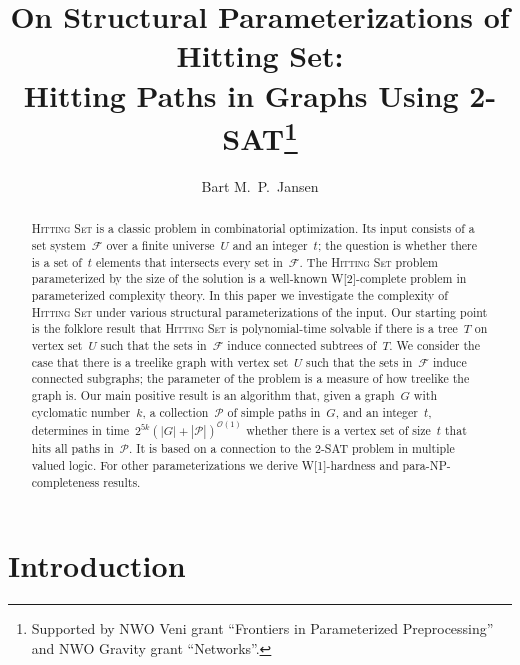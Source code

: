 \let\accentvec\vec  \documentclass{llncs}
\title{On Structural Parameterizations of Hitting Set: \\ Hitting Paths in Graphs Using 2-SAT\thanks{Supported by NWO Veni grant ``Frontiers in Parameterized Preprocessing'' and NWO Gravity grant ``Networks''.}}
\author{Bart M.\ P.\ Jansen \inst{1}}
\institute{Eindhoven University of Technology, The Netherlands. \email{b.m.p.jansen@tue.nl}}
\newcommand{\Oh}{{\mathcal{O}}}
\renewcommand{\P}{\ensuremath{\mathcal{P}}\xspace}
\newcommand{\F}{\ensuremath{\mathcal{F}}\xspace}
\newcommand{\HittingSet}{\textsc{Hitting Set}\xspace}
\begin{document}
\hypersetup{bookmarksdepth=-1}

\maketitle

\hypersetup{bookmarksdepth=2} 

\begin{abstract}
\HittingSet is a classic problem in combinatorial optimization. Its input consists of a set system~$\F$ over a finite universe~$U$ and an integer~$t$; the question is whether there is a set of~$t$ elements that intersects every set in~$\F$. The \HittingSet problem parameterized by the size of the solution is a well-known W[2]-complete problem in parameterized complexity theory. In this paper we investigate the complexity of \HittingSet under various structural parameterizations of the input. Our starting point is the folklore result that \HittingSet is polynomial-time solvable if there is a tree~$T$ on vertex set~$U$ such that the sets in~$\F$ induce connected subtrees of~$T$. We consider the case that there is a treelike graph with vertex set~$U$ such that the sets in~$\F$ induce connected subgraphs; the parameter of the problem is a measure of how treelike the graph is. Our main positive result is an algorithm that, given a graph~$G$ with cyclomatic number~$k$, a collection~$\P$ of simple paths in~$G$, and an integer~$t$, determines in time~$2^{5k} (|G| +|\P|)^{\Oh(1)}$ whether there is a vertex set of size~$t$ that hits all paths in~$\P$. It is based on a connection to the 2-SAT problem in multiple valued logic. For other parameterizations we derive W[1]-hardness and para-NP-completeness results.
\end{abstract}

\section{Introduction}
\end{document}
